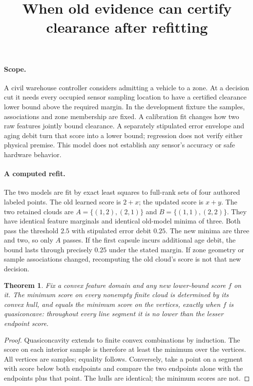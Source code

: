 \documentclass{article}
\newtheorem{theorem}{Theorem}
\begin{document}
\title{When old evidence can certify clearance after refitting}
\maketitle

\paragraph{Scope.}
A civil warehouse controller considers admitting a vehicle to a zone. At a
decision cut it needs every occupied sensor sampling location to have
a certified clearance lower bound above the required margin. In the
development fixture the samples, associations and zone membership are fixed.
A calibration fit changes how two raw features jointly bound clearance.
A separately stipulated error envelope and aging debit turn that score
into a lower bound; regression does not verify either physical premise.
This model does not establish any sensor's accuracy or safe hardware
behavior.

\paragraph{A computed refit.}
The two models are fit by exact least squares to full-rank sets of four
authored labeled points. The old learned score is $2+x$; the updated score
is $x+y$. The two retained clouds are
$A=\{(1,2),(2,1)\}$ and $B=\{(1,1),(2,2)\}$.
They have identical feature marginals and identical old-model minima of
three. Both pass the threshold $2.5$ with stipulated error debit $0.25$.
The new minima are three and two, so only $A$ passes. If the first
capsule incurs additional age debit, the bound lasts through precisely
$0.25$ under the stated margin. If zone geometry or sample associations
changed, recomputing the old cloud's score is not that new decision.

\begin{theorem}
Fix a convex feature domain and any new lower-bound score $f$ on it.
The minimum score on every nonempty finite cloud is determined by its
convex hull, and equals the minimum score on the vertices, exactly
when $f$ is quasiconcave: throughout every line segment it is no lower
than the lesser endpoint score.
\end{theorem}
\begin{proof}
Quasiconcavity extends to finite convex combinations by induction.
The score on each interior sample is therefore at least the minimum
over the vertices. All vertices are samples; equality follows.
Conversely, take a point on a segment with score below both endpoints
and compare the two endpoints alone with the endpoints plus that point.
The hulls are identical; the minimum scores are not.
\end{proof}
\end{document}
